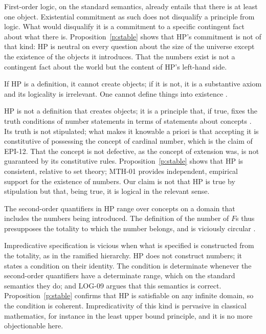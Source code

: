\documentclass{situationist-preprint}
\begin{document}
\begin{reply}
First-order logic, on the standard semantics, already entails that there is at least one object. Existential commitment as such does not disqualify a principle from logic. What would disqualify it is a commitment to a specific contingent fact about what there is. Proposition~\ref{p:stable} shows that HP's commitment is not of that kind: HP is neutral on every question about the size of the universe except the existence of the objects it introduces. That the numbers exist is not a contingent fact about the world but the content of HP's left-hand side.
\end{reply}

\begin{objection}
If HP is a definition, it cannot create objects; if it is not, it is a substantive axiom and its logicality is irrelevant. One cannot define things into existence \citep{Field1984}.
\end{objection}

\begin{reply}
HP is not a definition that creates objects; it is a principle that, if true, fixes the truth conditions of number statements in terms of statements about concepts \citep{Wright1997}. Its truth is not stipulated; what makes it knowable a priori is that accepting it is constitutive of possessing the concept of cardinal number, which is the claim of EPI-12. That the concept is not defective, as the concept of extension was, is not guaranteed by its constitutive rules. Proposition~\ref{p:stable} shows that HP is consistent, relative to set theory; MTH-01 provides independent, empirical support for the existence of numbers. Our claim is not that HP is true by stipulation but that, being true, it is logical in the relevant sense.
\end{reply}

\begin{objection}[Impredicativity]
The second-order quantifiers in HP range over concepts on a domain that includes the numbers being introduced. The definition of the number of $F$s thus presupposes the totality to which the number belongs, and is viciously circular \citep{Dummett1991}.
\end{objection}

\begin{reply}
Impredicative specification is vicious when what is specified is constructed from the totality, as in the ramified hierarchy. HP does not construct numbers; it states a condition on their identity. The condition is determinate whenever the second-order quantifiers have a determinate range, which on the standard semantics they do; and LOG-09 argues that this semantics is correct. Proposition~\ref{p:stable} confirms that HP is satisfiable on any infinite domain, so the condition is coherent. Impredicativity of this kind is pervasive in classical mathematics, for instance in the least upper bound principle, and it is no more objectionable here.
\end{reply}
\end{document}
